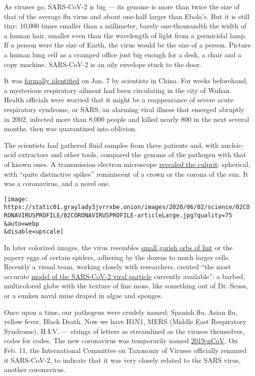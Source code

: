 As viruses go, SARS-CoV-2 is big --- its genome is more than twice the
size of that of the average flu virus and about one-half larger than
Ebola's. But it is still tiny: 10,000 times smaller than a millimeter,
barely one-thousandth the width of a human hair, smaller even than the
wavelength of light from a germicidal lamp. If a person were the size of
Earth, the virus would be the size of a person. Picture a human lung
cell as a cramped office just big enough for a desk, a chair and a copy
machine. SARS-CoV-2 is an oily envelope stuck to the door.

It was
\href{https://www.nytimes3xbfgragh.onion/2020/01/08/health/china-pneumonia-outbreak-virus.html}{formally
identified} on Jan. 7 by scientists in China. For weeks beforehand, a
mysterious respiratory ailment had been circulating in the city of
Wuhan. Health officials were worried that it might be a reappearance of
severe acute respiratory syndrome, or SARS, an alarming viral illness
that emerged abruptly in 2002, infected more than 8,000 people and
killed nearly 800 in the next several months, then was quarantined into
oblivion.

The scientists had gathered fluid samples from three patients and, with
nucleic-acid extractors and other tools, compared the genome of the
pathogen with that of known ones. A transmission electron microscope
\href{https://www.nejm.org/doi/full/10.1056/NEJMoa2001017}{revealed the
culprit}: spherical, with ``quite distinctive spikes'' reminiscent of a
crown or the corona of the sun. It was a coronavirus, and a novel one.

\texttt{[image: https://static01.graylady3jvrrxbe.onion/images/2020/06/02/science/02CORONAVIRUSPROFILE/02CORONAVIRUSPROFILE-articleLarge.jpg?quality=75\\\&auto=webp\\\&disable=upscale]}

In later colorized images, the virus resembles
\href{https://www.youtube.com/watch?v=oBQvvCY2Mj0}{small garish orbs of
lint} or the papery eggs of certain spiders, adhering by the dozens to
much larger cells. Recently a visual team, working closely with
researchers, created ``the most accurate
\href{https://vimeo.com/417208044/758c67edaf}{model of the SARS-CoV-2
viral particle} currently available'': a barbed, multicolored globe with
the texture of fine moss, like something out of Dr. Seuss, or a sunken
naval mine draped in algae and sponges.

Once upon a time, our pathogens were crudely named: Spanish flu, Asian
flu, yellow fever, Black Death. Now we have H1N1, MERS (Middle East
Respiratory Syndrome), H.I.V. --- strings of letters as streamlined as
the viruses themselves, codes for codes. The new coronavirus was
temporarily named
\href{https://www.who.int/docs/default-source/coronaviruse/situation-reports/20200130-sitrep-10-ncov.pdf?sfvrsn=d0b2e480_2}{2019-nCoV}.
On Feb. 11, the International Committee on Taxonomy of Viruses
officially renamed it SARS-CoV-2, to indicate that it was very closely
related to the SARS virus, another coronavirus.

